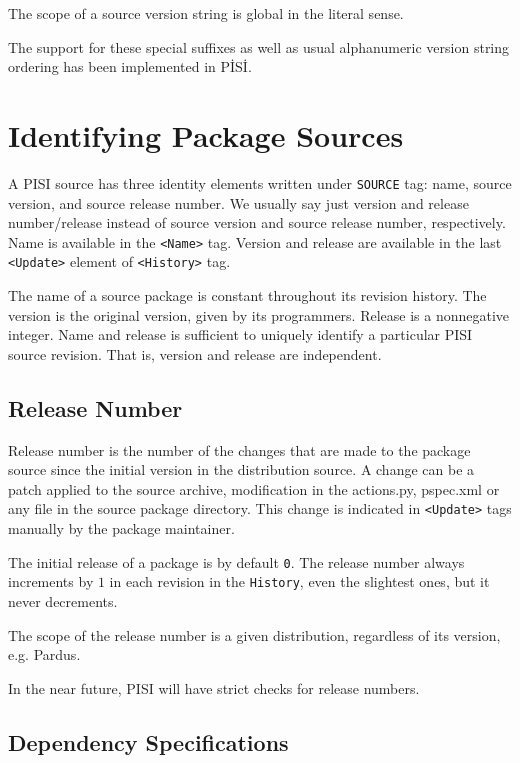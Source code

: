\documentclass[a4paper,11pt]{article}
\begin{document}
The scope of a source version string is global in the literal
sense.

The support for these special suffixes as well as usual alphanumeric
version string ordering has been implemented in P\.IS\.I.

\section{Identifying Package Sources}

A PISI source has three identity elements written under
\texttt{SOURCE} tag: name, source version, and source release number.
We usually say just version and release number/release instead of
source version and source release number, respectively. Name is available in
the \texttt{<Name>} tag. Version and release are available in the last
\texttt{<Update>} element of \texttt{<History>} tag.

The name of a source package is constant throughout its revision
history. The version is the original version, given by its
programmers. Release is a nonnegative integer.  Name and release is sufficient to uniquely identify a
particular PISI source revision.  That is, version and release are
independent.

\subsection{Release Number}

Release number is the number of the changes that are made to the
package source since the initial version in the distribution source. A
change can be a patch applied to the source archive, modification in
the actions.py, pspec.xml or any file in the source package
directory. This change is indicated in \texttt{<Update>} tags manually
by the package maintainer.

The initial release of a package is by default \texttt{0}. The release
number always increments by $1$ in each revision in the
\texttt{History}, even the slightest ones, but it never decrements.

The scope of the release number is a given distribution, regardless of
its version, e.g. Pardus.

In the near future, PISI will have strict checks for release numbers.

\subsection{Dependency Specifications}
\end{document}
